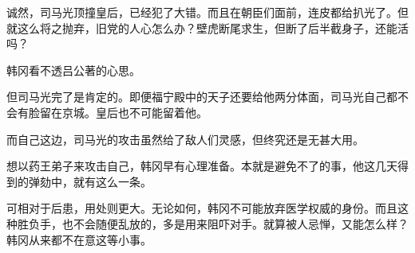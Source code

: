 诚然，司马光顶撞皇后，已经犯了大错。而且在朝臣们面前，连皮都给扒光了。但就这么将之抛弃，旧党的人心怎么办？壁虎断尾求生，但断了后半截身子，还能活吗？

韩冈看不透吕公著的心思。

但司马光完了是肯定的。即便福宁殿中的天子还要给他两分体面，司马光自己都不会有脸留在京城。皇后也不可能留着他。

而自己这边，司马光的攻击虽然给了敌人们灵感，但终究还是无甚大用。

想以药王弟子来攻击自己，韩冈早有心理准备。本就是避免不了的事，他这几天得到的弹劾中，就有这么一条。

可相对于后患，用处则更大。无论如何，韩冈不可能放弃医学权威的身份。而且这种胜负手，也不会随便乱放的，多是用来阻吓对手。就算被人忌惮，又能怎么样？韩冈从来都不在意这等小事。

